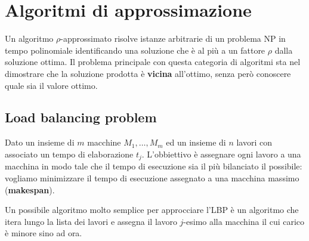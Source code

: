 \documentclass[\main/main.tex]{subfiles}
\begin{document}
\chapter{Algoritmi di approssimazione}
\begin{multicols}{2}
\begin{definition}
    Un algoritmo \(\rho\)-approssimato risolve istanze arbitrarie di un problema NP in tempo polinomiale identificando una soluzione che è al più a un fattore \(\rho\) dalla soluzione ottima. Il problema principale con questa categoria di algoritmi sta nel dimostrare che la soluzione prodotta è \textbf{vicina} all'ottimo, senza però conoscere quale sia il valore ottimo.
\end{definition}
\section{Load balancing problem}
\begin{problem}
    Dato un insieme di \(m\) macchine \(M_1, \ldots, M_m\) ed un insieme di \(n\) lavori con associato un tempo di elaborazione \(t_j\). L'obbiettivo è assegnare ogni lavoro a una macchina in modo tale che il tempo di esecuzione sia il più bilanciato il possibile: vogliamo minimizzare il tempo di esecuzione assegnato a una macchina massimo (\textbf{makespan}).
\end{problem}
\begin{example}
    Un possibile algoritmo molto semplice per approcciare l'LBP è un algoritmo che itera lungo la lista dei lavori e assegna il lavoro \(j\)-esimo alla macchina il cui carico è minore sino ad ora.
\end{example}
\end{multicols}
\end{document}
